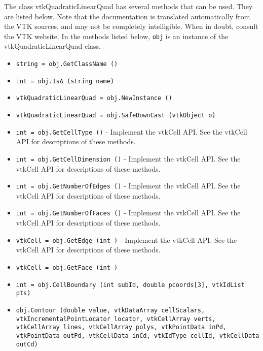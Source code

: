 The class vtkQuadraticLinearQuad has several methods that can be used.
  They are listed below.
Note that the documentation is translated automatically from the VTK sources,
and may not be completely intelligible.  When in doubt, consult the VTK website.
In the methods listed below, \verb|obj| is an instance of the vtkQuadraticLinearQuad class.
\begin{itemize}
\item  \verb|string = obj.GetClassName ()|

\item  \verb|int = obj.IsA (string name)|

\item  \verb|vtkQuadraticLinearQuad = obj.NewInstance ()|

\item  \verb|vtkQuadraticLinearQuad = obj.SafeDownCast (vtkObject o)|

\item  \verb|int = obj.GetCellType ()| -  Implement the vtkCell API. See the vtkCell API for descriptions
 of these methods.

\item  \verb|int = obj.GetCellDimension ()| -  Implement the vtkCell API. See the vtkCell API for descriptions
 of these methods.

\item  \verb|int = obj.GetNumberOfEdges ()| -  Implement the vtkCell API. See the vtkCell API for descriptions
 of these methods.

\item  \verb|int = obj.GetNumberOfFaces ()| -  Implement the vtkCell API. See the vtkCell API for descriptions
 of these methods.

\item  \verb|vtkCell = obj.GetEdge (int )| -  Implement the vtkCell API. See the vtkCell API for descriptions
 of these methods.

\item  \verb|vtkCell = obj.GetFace (int )|

\item  \verb|int = obj.CellBoundary (int subId, double pcoords[3], vtkIdList pts)|

\item  \verb|obj.Contour (double value, vtkDataArray cellScalars, vtkIncrementalPointLocator locator, vtkCellArray verts, vtkCellArray lines, vtkCellArray polys, vtkPointData inPd, vtkPointData outPd, vtkCellData inCd, vtkIdType cellId, vtkCellData outCd)|


\end{itemize}
